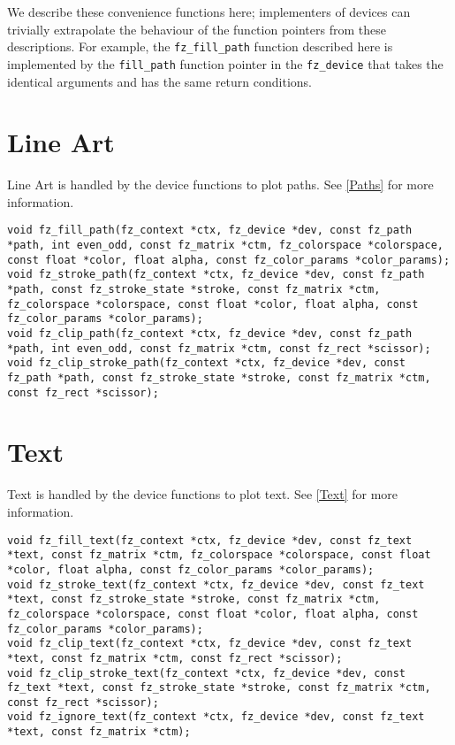 \documentclass[oneside]{book}
\newcommand{\rjwref}[1] {\autoref{#1} \nameref{#1}}
\begin{document}
We describe these convenience functions here; implementers of devices can trivially extrapolate the behaviour of the function pointers from these descriptions. For example, the \texttt{fz\_fill\_path} function described here is implemented by the \texttt{fill\_path} function pointer in the \texttt{fz\_device} that takes the identical arguments and has the same return conditions.

\section{Line Art}
\label{DevicePaths}

Line Art is handled by the device functions to plot paths. See \rjwref{Paths} for more information.

\begin{lstlisting}
void fz_fill_path(fz_context *ctx, fz_device *dev, const fz_path *path, int even_odd, const fz_matrix *ctm, fz_colorspace *colorspace, const float *color, float alpha, const fz_color_params *color_params);
void fz_stroke_path(fz_context *ctx, fz_device *dev, const fz_path *path, const fz_stroke_state *stroke, const fz_matrix *ctm, fz_colorspace *colorspace, const float *color, float alpha, const fz_color_params *color_params);
void fz_clip_path(fz_context *ctx, fz_device *dev, const fz_path *path, int even_odd, const fz_matrix *ctm, const fz_rect *scissor);
void fz_clip_stroke_path(fz_context *ctx, fz_device *dev, const fz_path *path, const fz_stroke_state *stroke, const fz_matrix *ctm, const fz_rect *scissor);
\end{lstlisting}

\section{Text}
\label{DeviceText}

Text is handled by the device functions to plot text. See \rjwref{Text} for more information.

\begin{lstlisting}
void fz_fill_text(fz_context *ctx, fz_device *dev, const fz_text *text, const fz_matrix *ctm, fz_colorspace *colorspace, const float *color, float alpha, const fz_color_params *color_params);
void fz_stroke_text(fz_context *ctx, fz_device *dev, const fz_text *text, const fz_stroke_state *stroke, const fz_matrix *ctm, fz_colorspace *colorspace, const float *color, float alpha, const fz_color_params *color_params);
void fz_clip_text(fz_context *ctx, fz_device *dev, const fz_text *text, const fz_matrix *ctm, const fz_rect *scissor);
void fz_clip_stroke_text(fz_context *ctx, fz_device *dev, const fz_text *text, const fz_stroke_state *stroke, const fz_matrix *ctm, const fz_rect *scissor);
void fz_ignore_text(fz_context *ctx, fz_device *dev, const fz_text *text, const fz_matrix *ctm);
\end{lstlisting}
\end{document}
